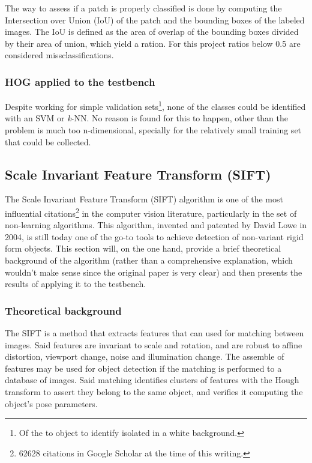 \documentclass[../main.tex]{subfiles}
\begin{document}
The way to assess if a patch is properly classified is done by computing the Intersection over Union (IoU) of the patch and the bounding boxes of the labeled images. The IoU is defined as the area of overlap of the bounding boxes divided by their area of union, which yield a ration. For this project ratios below 0.5 are considered missclassifications.

\subsubsection{HOG applied to the testbench}
Despite working for simple validation sets\footnote{Of the to object to identify isolated in a white background.}, none of the classes could be identified with an SVM or \emph{k}-NN. No reason is found for this to happen, other than the problem is much too n-dimensional, specially for the relatively small training set that could be collected. 

\subsection{Scale Invariant Feature Transform (SIFT)}
The Scale Invariant Feature Transform (SIFT) \cite{SIFTlowe2004} algorithm is one of the most influential citations\footnote{62628 citations in Google Scholar at the time of this writing.} in the computer vision literature, particularly in the set of non-learning algorithms. This algorithm, invented and patented by David Lowe in 2004, is still today one of the go-to tools to achieve detection of non-variant rigid form objects. This section will, on the one hand, provide a brief theoretical background of the algorithm (rather than a comprehensive explanation, which wouldn't make sense since the original paper is very clear) and then presents the results of applying it to the testbench.

\subsubsection{Theoretical background}
The SIFT is a method that extracts features that can used for matching between images. Said features are invariant to scale and rotation, and are robust to affine distortion, viewport change, noise and illumination change. The assemble of features may be used for object detection if the matching is performed to a database of images. Said matching identifies clusters of features with the Hough transform to assert they belong to the same object, and verifies it computing the object's pose parameters.
\end{document}
